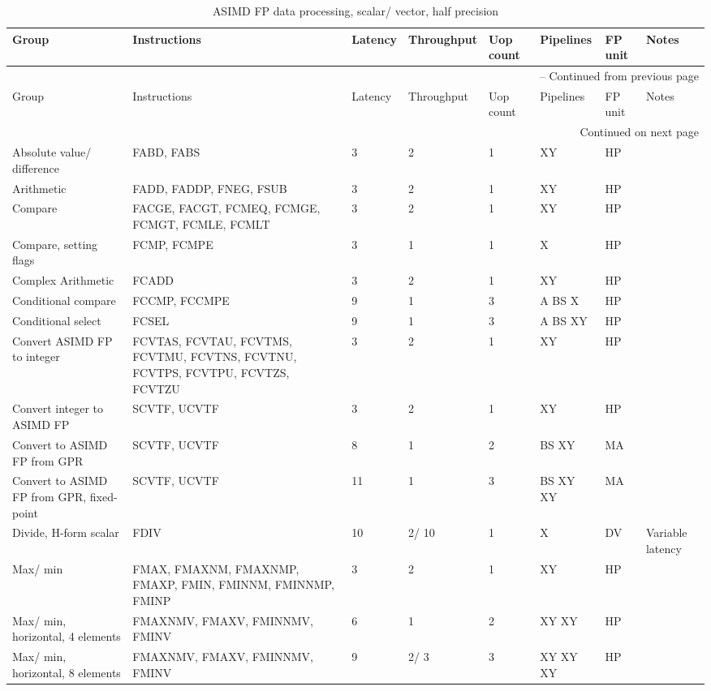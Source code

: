 \begin{longtable}{|p{1in}|p{1in}|l|l|l|p{1in}|l|p{1in}|}
\caption{ASIMD FP data processing, scalar/ vector, half precision} \\
\hline
Group & Instructions & Latency & Throughput & Uop count & Pipelines & FP unit & Notes\\
\hline
\endfirsthead
\hline
\multicolumn{8}{|r|}{{\tablename\ \thetable{} -- Continued from previous page}} \\
\hline
Group & Instructions & Latency & Throughput & Uop count & Pipelines & FP unit & Notes\\
\hline
\endhead
\hline
\multicolumn{8}{|r|}{{Continued on next page}} \\
\hline
\endfoot
\hline
\endlastfoot
Absolute value/ difference & FABD, FABS & 3 & 2 & 1 & XY & HP & \\
\hline
Arithmetic & FADD, FADDP, FNEG, FSUB & 3 & 2 & 1 & XY & HP & \\
\hline
Compare & FACGE, FACGT, FCMEQ, FCMGE, FCMGT, FCMLE, FCMLT & 3 & 2 & 1 & XY & HP & \\
\hline
Compare, setting flags & FCMP, FCMPE & 3 & 1 & 1 & X & HP & \\
\hline
Complex Arithmetic & FCADD & 3 & 2 & 1 & XY & HP & \\
\hline
Conditional compare & FCCMP, FCCMPE & 9 & 1 & 3 & A BS X & HP & \\
\hline
Conditional select & FCSEL & 9 & 1 & 3 & A BS XY & HP & \\
\hline
Convert ASIMD FP to integer & FCVTAS, FCVTAU, FCVTMS, FCVTMU, FCVTNS, FCVTNU, FCVTPS, FCVTPU, FCVTZS, FCVTZU & 3 & 2 & 1 & XY & HP & \\
\hline
Convert integer to ASIMD FP & SCVTF, UCVTF & 3 & 2 & 1 & XY & HP & \\
\hline
Convert to ASIMD FP from GPR & SCVTF, UCVTF & 8 & 1 & 2 & BS XY & MA & \\
\hline
Convert to ASIMD FP from GPR, fixed-point & SCVTF, UCVTF & 11 & 1 & 3 & BS XY XY & MA & \\
\hline
Divide, H-form scalar & FDIV & 10 & 2/ 10 & 1 & X & DV & Variable latency\\
\hline
Max/ min & FMAX, FMAXNM, FMAXNMP, FMAXP, FMIN, FMINNM, FMINNMP, FMINP & 3 & 2 & 1 & XY & HP & \\
\hline
Max/ min, horizontal, 4 elements & FMAXNMV, FMAXV, FMINNMV, FMINV & 6 & 1 & 2 & XY XY & HP & \\
\hline
Max/ min, horizontal, 8 elements & FMAXNMV, FMAXV, FMINNMV, FMINV & 9 & 2/ 3 & 3 & XY XY XY & HP & \\

\end{longtable}
